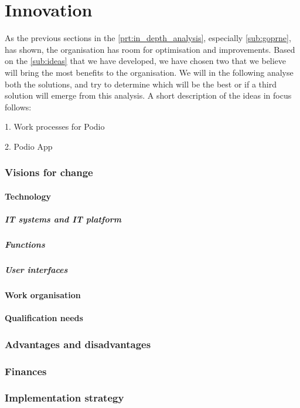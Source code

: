 \part{Innovation}
As the previous sections in the \ref{prt:in_depth_analysis}, especially \ref{sub:goprne}, has shown,
the organisation has room for optimisation and improvements. Based on the \ref{sub:ideas} that we
have developed, we have chosen two that we believe will bring the most benefits to the organisation.
We will in the following analyse both the solutions, and try to determine which will be the best or
if a third solution will emerge from this analysis. A short description of the ideas in focus
follows:

1. Work processes for Podio

2. Podio App

\section{Visions for change}

\subsection{Technology}
\label{sub:technology}

\subsubsection{IT systems and IT platform}

\subsubsection{Functions}

\subsubsection{User interfaces}

\subsection{Work organisation}
\label{sub:work_organisation}

\subsection{Qualification needs}
\label{sub:qualification_needs}

\section{Advantages and disadvantages}

\section{Finances}

\section{Implementation strategy}



